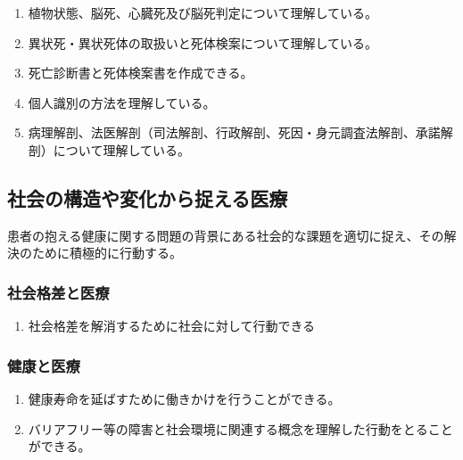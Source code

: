 \begin{enumerate}
\def\labelenumi{\arabic{enumi}.}
\tightlist
\item
  植物状態、脳死、心臓死及び脳死判定について理解している。
\item
  異状死・異状死体の取扱いと死体検案について理解している。
\item
  死亡診断書と死体検案書を作成できる。
\item
  個人識別の方法を理解している。
\item
  病理解剖、法医解剖（司法解剖、行政解剖、死因・身元調査法解剖、承諾解剖）について理解している。
\end{enumerate}

\hypertarget{ux793eux4f1aux306eux69cbux9020ux3084ux5909ux5316ux304bux3089ux6349ux3048ux308bux533bux7642}{%
\subsection{社会の構造や変化から捉える医療}\label{ux793eux4f1aux306eux69cbux9020ux3084ux5909ux5316ux304bux3089ux6349ux3048ux308bux533bux7642}}

患者の抱える健康に関する問題の背景にある社会的な課題を適切に捉え、その解決のために積極的に行動する。

\hypertarget{ux793eux4f1aux683cux5deeux3068ux533bux7642}{%
\subsubsection{社会格差と医療}\label{ux793eux4f1aux683cux5deeux3068ux533bux7642}}

\begin{enumerate}
\def\labelenumi{\arabic{enumi}.}
\tightlist
\item
  社会格差を解消するために社会に対して行動できる
\end{enumerate}

\hypertarget{ux5065ux5eb7ux3068ux533bux7642}{%
\subsubsection{健康と医療}\label{ux5065ux5eb7ux3068ux533bux7642}}

\begin{enumerate}
\def\labelenumi{\arabic{enumi}.}
\tightlist
\item
  健康寿命を延ばすために働きかけを行うことができる。
\item
  バリアフリー等の障害と社会環境に関連する概念を理解した行動をとることができる。
\end{enumerate}

